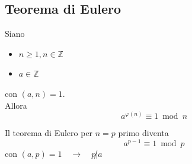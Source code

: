 \documentclass[a4paper,12pt, oneside]{book}
\begin{document}
\subsection{Teorema di Eulero}
\begin{teorema}
	Siano \begin{itemize}
		\item $n \geq 1, n \in \mathbb{Z}$
		\item $a \in \mathbb{Z}$
	\end{itemize}
	con $(a,n)=1$.\\
	Allora $$a^{\varphi(n)} \equiv 1 \bmod n$$

	\begin{osservazione}
		Il teorema di Eulero per $n=p$ primo diventa
		$$a^{p-1} \equiv 1 \bmod p$$
		con $(a,p)=1 \quad \rightarrow \quad p \not | a$
	\end{osservazione}


\end{teorema}
\end{document}
